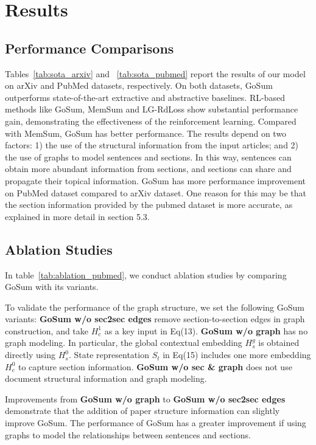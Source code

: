 \section{Results}

\subsection{Performance Comparisons}
Tables~\ref{tab:sota_arxiv} and ~\ref{tab:sota_pubmed} report the results of our model on arXiv and PubMed datasets, respectively.
On both datasets, GoSum outperforms state-of-the-art extractive and abstractive baselines. 
RL-based methods like GoSum, MemSum and LG-RdLoss show substantial performance gain, demonstrating the effectiveness of the reinforcement learning.
Compared with MemSum, GoSum has better performance. The results depend on two factors: 1) the use of the structural information from the input articles; and 2) the use of graphs to model sentences and sections. In this way, sentences can obtain more abundant information from sections, and sections can share and propagate their topical information.
GoSum has more performance improvement on PubMed dataset compared to arXiv dataset. One reason for this may be that the section information provided by the pubmed dataset is more accurate, as explained in more detail in section 5.3.

\subsection{Ablation Studies}

In table~\ref{tab:ablation_pubmed}, we conduct ablation studies by comparing GoSum with its variants.

To validate the performance of the graph structure, we set the following GoSum variants:
\textbf{GoSum w/o sec2sec edges} remove section-to-section edges in graph construction, and take $H_c^1$ as a key input in Eq(13).
\textbf{GoSum w/o graph} has no graph modeling. In particular, the global contextual embedding $H_s^g$ is obtained directly using $H_s^0$. State representation $S_t$ in Eq(15) includes one more embedding $H_c^0$ to capture section information.
\textbf{GoSum w/o sec \& graph} does not use document structural information and graph modeling.

Improvements from \textbf{GoSum w/o graph} to \textbf{GoSum w/o sec2sec edges} demonstrate that the addition of paper structure information can slightly improve GoSum. The performance of GoSum has a greater improvement if using graphs to model the relationships between sentences and sections.

